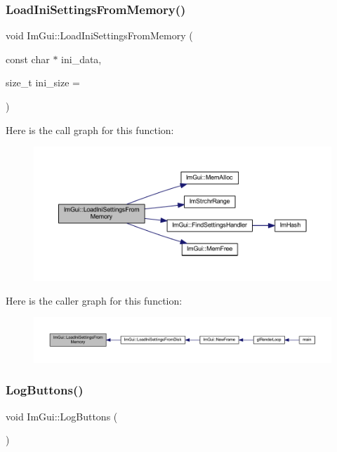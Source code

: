 \subsubsection{\texorpdfstring{Load\+Ini\+Settings\+From\+Memory()}{LoadIniSettingsFromMemory()}}
{\footnotesize\ttfamily void Im\+Gui\+::\+Load\+Ini\+Settings\+From\+Memory (\begin{DoxyParamCaption}\item[{const char $\ast$}]{ini\+\_\+data,  }\item[{size\+\_\+t}]{ini\+\_\+size = {} }\end{DoxyParamCaption})}

Here is the call graph for this function\+:
\nopagebreak
\begin{figure}[H]
\begin{center}
\leavevmode
\includegraphics[width=350pt]{namespace_im_gui_a8e37b6a0b2feb6cd6ac61a4259392861_cgraph}
\end{center}
\end{figure}
Here is the caller graph for this function\+:
\nopagebreak
\begin{figure}[H]
\begin{center}
\leavevmode
\includegraphics[width=350pt]{namespace_im_gui_a8e37b6a0b2feb6cd6ac61a4259392861_icgraph}
\end{center}
\end{figure}
\mbox{\label{namespace_im_gui_a7bd295da4be19bab98262c76fcaeb4fb}} 
\subsubsection{\texorpdfstring{Log\+Buttons()}{LogButtons()}}
{\footnotesize\ttfamily void Im\+Gui\+::\+Log\+Buttons (\begin{DoxyParamCaption}{ }\end{DoxyParamCaption})}

